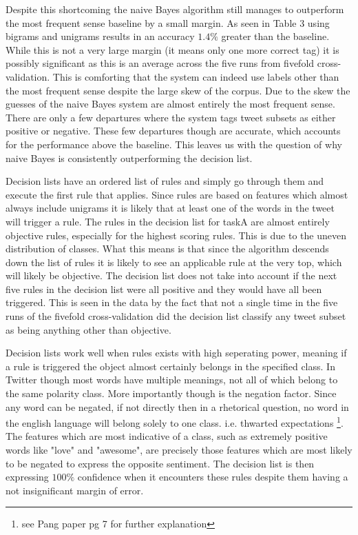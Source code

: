 \documentclass[11pt]{article}
\begin{document}
Despite this shortcoming the naive Bayes algorithm still manages to outperform the most frequent sense baseline by a small margin. As seen in Table 3 using bigrams and unigrams results in an accuracy $1.4\%$ greater than the baseline. While this is not a very large margin (it means only one more correct tag) it is possibly significant as this is an average across the five runs from fivefold cross-validation. This is comforting that the system can indeed use labels other than the most frequent sense despite the large skew of the corpus. Due to the skew the guesses of the naive Bayes system are almost entirely the most frequent sense. There are only a few departures where the system tags tweet subsets as either positive or negative. These few departures though are accurate, which accounts for the performance above the baseline. This leaves us with the question of why naive Bayes is consistently outperforming the decision list.

Decision lists have an ordered list of rules and simply go through them and execute the first rule that applies. Since rules are based on features which almost always include unigrams it is likely that at least one of the words in the tweet will trigger a rule. The rules in the decision list for taskA are almost entirely objective rules, especially for the highest scoring rules. This is due to the uneven distribution of classes. What this means is that since the algorithm descends down the list of rules it is likely to see an applicable rule at the very top, which will likely be objective. The decision list does not take into account if the next five rules in the decision list were all positive and they would have all been triggered. This is seen in the data by the fact that not a single time in the five runs of the fivefold cross-validation did the decision list classify any tweet subset as being anything other than objective.

Decision lists work well when rules exists with high seperating power, meaning if a rule is triggered the object almost certainly belongs in the specified class. In Twitter though most words have multiple meanings, not all of which belong to the same polarity class. More importantly though is the negation factor. Since any word can be negated, if not directly then in a rhetorical question, no word in the english language will belong solely to one class. i.e. thwarted expectations \footnote{see Pang paper pg 7 for further explanation}. The features which are most indicative of a class, such as extremely positive words like "love" and "awesome", are precisely those features which are most likely to be negated to express the opposite sentiment. The decision list is then expressing $100\%$ confidence when it encounters these rules despite them having a not insignificant margin of error.
\end{document}
